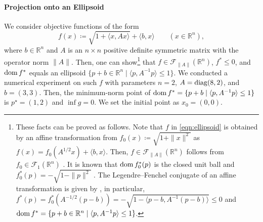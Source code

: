 \documentclass[11pt,a4paper]{article}
\theoremstyle{definition}
\theoremstyle{plain}
\newcommand{\RR}{{\mathbb{R}}}
\newcommand{\dom}{\mathop{\rm dom}}
\newcommand{\diag}{\mathop{\rm diag}}
\begin{document}
\paragraph{Projection onto an Ellipsoid}
We consider objective functions of the form
\begin{equation}\label{eqn:ellipsoid}
    f(x) \coloneqq \sqrt{1 + \langle x, Ax\rangle} + \langle b, x\rangle \qquad (x \in \RR^n),
\end{equation}
where $b \in \RR^n$ and $A$ is an $n \times n$ positive definite symmetric matrix with the operator norm $\|A\|$.
Then, one can show\footnote{These facts can be proved as follows. Note that $f$ in \eqref{eqn:ellipsoid} is obtained by an affine transformation from $f_0(x) \coloneqq \sqrt{1 + \|x\|^2}$ as $f(x) = f_0(A^{1/2}x) + \langle b, x\rangle$. Then, $f \in \mathcal{F}_{\|A\|}(\RR^n)$ follows from $f_0 \in \mathcal{F}_1(\RR^n)$ \cite[Example~5.14]{Beck2017}. It is known that $\dom f_0^\ast(p)$ is the closed unit ball and $f_0^\ast(p) = -\sqrt{1 - \|p\|^2}$ \cite[Section~4.4.14]{Beck2017}. The Legendre--Fenchel conjugate of an affine transformation is given by \cite[Theorem~12.3]{Rockafellar1970}, in particular, $f^\ast(p) = f_0^\ast(A^{-1/2}(p - b)) = -\sqrt{1 - \langle p - b, A^{-1}(p - b)\rangle} \le 0$ and $\dom f^\ast = \{p + b \in \RR^n \mid \langle p, A^{-1}p\rangle \le 1\}$.} that $f \in \mathcal{F}_{\|A\|}(\RR^n)$, $f^\ast \le 0$, and $\dom f^\ast$ equals an ellipsoid $\{p + b \in \RR^n \mid \langle p, A^{-1}p\rangle \le 1\}$.
We conducted a numerical experiment on such $f$ with parameters $n = 2$, $A = \diag(8, 2)$, and $b = (3, 3)$.
Then, the minimum-norm point of $\dom f^\ast = \{p + b \mid \langle p, A^{-1}p\rangle \le 1\}$ is $p^\star = (1, 2)$ and $\inf g = 0$.
We set the initial point as $x_0 = (0, 0)$.
\end{document}
